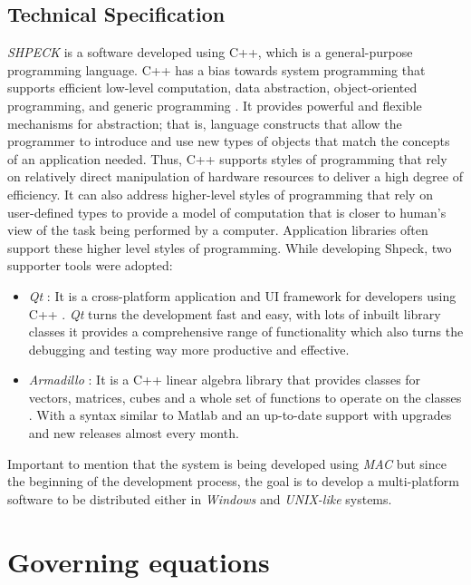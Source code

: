 \subsection{Technical Specification}
\emph{SHPECK} is a software developed using C++, which is a general-purpose programming language. C++ has a bias towards system programming that supports efficient low-level computation, data abstraction, object-oriented programming, and generic programming \cite{Dale:04} \cite{Stroustrup:97}. It provides powerful and flexible mechanisms for abstraction; that is, language constructs that allow the programmer to introduce and use new types of objects that match the concepts of an application needed. Thus, C++ supports styles of programming that rely on relatively direct manipulation of hardware resources to deliver a high degree of efficiency. It can also address higher-level styles of programming that rely on user-defined types to provide a model of computation that is closer to human's view of the task being performed by a computer. Application libraries often support these higher level styles of programming. While developing Shpeck, two supporter tools were adopted:
\begin{itemize}
\item \emph{Qt} : It is a cross-platform application and UI framework for developers using C++  \cite{Qt:14}. \emph{Qt} turns the development fast and easy, with lots of inbuilt library classes it provides a comprehensive range of functionality which also turns the debugging and testing way more productive and effective.
\item \emph{Armadillo} : It is a C++ linear algebra library that provides classes for vectors, matrices, cubes and a whole set of functions to operate on the classes \cite{arma:14}. With a syntax similar to Matlab and an up-to-date support with upgrades and new releases almost every month.
\end{itemize}
Important to mention that the system is being developed using \emph{MAC} but since the beginning of the development process, the goal is to develop a multi-platform software to be distributed either in \emph{Windows} and \emph{UNIX-like} systems.

\section{Governing equations}

